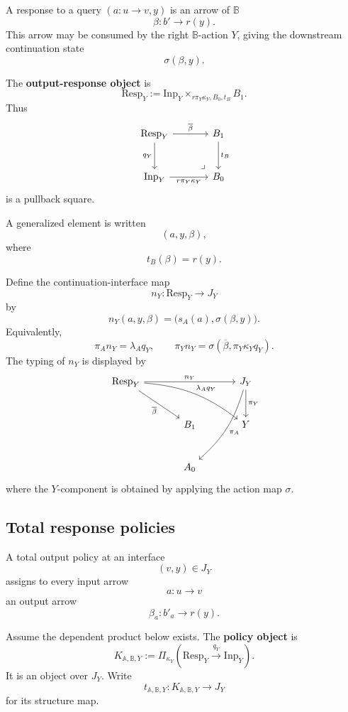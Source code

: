A response to a query \((a:u\to v,y)\) is an arrow of \(\mathbb B\)
\[
\beta:b'\to r(y).
\]
This arrow may be consumed by the right \(\mathbb B\)-action \(Y\), giving the
downstream continuation state
\[
\sigma(\beta,y).
\]

\begin{definition}
\label{def:poly-relative-output-response-object}
The \textbf{output-response object} is
\[
\mathrm{Resp}_Y
:=
\mathrm{Inp}_Y\times_{r\pi_Y\kappa_Y,B_0,t_B}B_1.
\]
Thus
\[
\begin{tikzcd}[column sep=large,row sep=large]
\mathrm{Resp}_Y
  \arrow[r,"\overline\beta"]
  \arrow[d,"q_Y"']
&
B_1
  \arrow[d,"t_B"]
\\
\mathrm{Inp}_Y
  \arrow[r,"r\pi_Y\kappa_Y"']
&
B_0
\arrow[ul,phantom,very near start,"\lrcorner"]
\end{tikzcd}
\]
is a pullback square.
\end{definition}

A generalized element is written
\[
(a,y,\beta),
\]
where
\[
t_B(\beta)=r(y).
\]

Define the continuation-interface map
\[
n_Y:\mathrm{Resp}_Y\to J_Y
\]
by
\[
n_Y(a,y,\beta)
=
\bigl(
s_A(a),
\sigma(\beta,y)
\bigr).
\]
Equivalently,
\[
\pi_A n_Y=\lambda_A q_Y,
\qquad
\pi_Y n_Y=\sigma(\overline\beta,\pi_Y\kappa_Yq_Y).
\]
The typing of \(n_Y\) is displayed by
\[
\begin{tikzcd}[column sep=large,row sep=large]
\mathrm{Resp}_Y
  \arrow[rr,"n_Y"]
  \arrow[drr,bend left=16,"\lambda_Aq_Y"]
  \arrow[dr,"\overline\beta"']
&&
J_Y
  \arrow[d,"\pi_Y"]
  \arrow[ddl,bend left=16,"\pi_A"]
\\
&
B_1
&
Y
\\
&
A_0
&
\end{tikzcd}
\]
where the \(Y\)-component is obtained by applying the action map \(\sigma\).

\subsection{Total response policies}
\label{subsec:poly-relative-total-policies}

A total output policy at an interface
\[
(v,y)\in J_Y
\]
assigns to every input arrow
\[
a:u\to v
\]
an output arrow
\[
\beta_a:b'_a\to r(y).
\]

\begin{definition}
\label{def:poly-relative-policy-object}
Assume the dependent product below exists.  The \textbf{policy object} is
\[
K_{\mathbb A,\mathbb B,Y}
:=
\Pi_{\kappa_Y}(\mathrm{Resp}_Y\xrightarrow{q_Y}\mathrm{Inp}_Y).
\]
It is an object over \(J_Y\).  Write
\[
t_{\mathbb A,\mathbb B,Y}:
K_{\mathbb A,\mathbb B,Y}\to J_Y
\]
for its structure map.
\end{definition}

